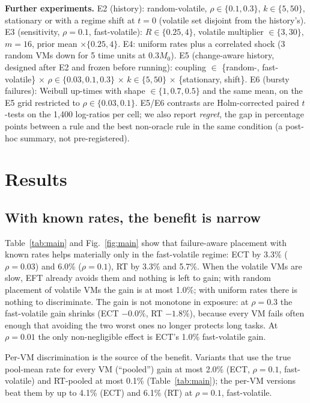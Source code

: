 \documentclass[conference]{IEEEtran}
\newcommand{\EFT}{\textsf{EFT}}
\newcommand{\ECT}{\textsf{ECT}}
\newcommand{\RT}{\textsf{RT}}
\begin{document}
\textbf{Further experiments.} E2 (history): random-volatile, $\rho\in\{0.1,0.3\}$, $k\in\{5,50\}$, stationary or with a
regime shift at $t=0$ (volatile set disjoint from the history's). E3 (sensitivity, $\rho=0.1$, fast-volatile):
$R\in\{0.25,4\}$, volatile multiplier $\in\{3,30\}$, $m=16$, prior mean $\times\{0.25,4\}$. E4: uniform rates plus a
correlated shock (3 random VMs down for 5 time units at $0.3M_0$). E5 (change-aware history, designed after E2 and
frozen before running): coupling $\in$ \{random-, fast-volatile\} $\times$ $\rho\in\{0.03,0.1,0.3\}$ $\times$ $k\in\{5,50\}$
$\times$ \{stationary, shift\}. E6 (bursty failures): Weibull up-times with shape $\in\{1, 0.7, 0.5\}$ and the same mean, on
the E5 grid restricted to $\rho\in\{0.03,0.1\}$. E5/E6 contrasts are Holm-corrected paired $t$-tests on the 1{,}400 log-ratios per
cell; we also report \emph{regret}, the gap in percentage points between a rule and the best non-oracle rule in the same
condition (a post-hoc summary, not pre-registered).

\section{Results}


\subsection{With known rates, the benefit is narrow}
Table~\ref{tab:main} and Fig.~\ref{fig:main} show that failure-aware placement with known rates helps materially
only in the fast-volatile regime: \ECT{} by 3.3\% ($\rho=0.03$) and 6.0\% ($\rho=0.1$), \RT{} by 3.3\% and 5.7\%.
When the volatile VMs are slow, \EFT{} already avoids them and nothing is left to gain; with random placement of
volatile VMs the gain is at most 1.0\%; with uniform rates there is nothing to discriminate. The gain is not
monotone in exposure: at $\rho=0.3$ the fast-volatile gain shrinks (\ECT{} $-0.0\%$, \RT{} $-1.8\%$), because every
VM fails often enough that avoiding the two worst ones no longer protects long tasks. At $\rho=0.01$ the only
non-negligible effect is \ECT{}'s 1.0\% fast-volatile gain.

Per-VM discrimination is the source of the benefit. Variants that use the true pool-mean rate for every VM
(``pooled'') gain at most 2.0\% (\ECT{}, $\rho=0.1$, fast-volatile) and \RT{}-pooled at most 0.1\% (Table~\ref{tab:main});
the per-VM versions beat them by up to 4.1\% (\ECT{}) and 6.1\% (\RT{}) at $\rho=0.1$, fast-volatile.
\end{document}

